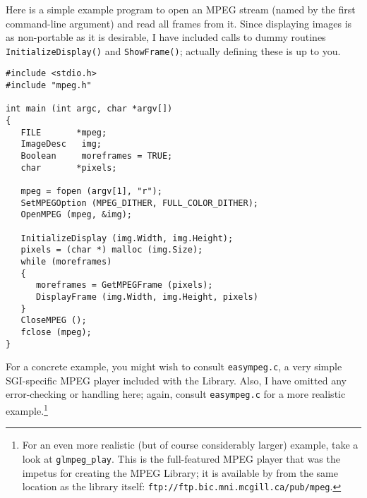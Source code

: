 \documentclass[11pt]{article}
\newcommand{\code}[1]{\texttt{#1}}
\begin{document}
Here is a simple example program to open an MPEG stream (named by the
first command-line argument) and read all frames from it.  Since
displaying images is as non-portable as it is desirable, I have
included calls to dummy routines \code{InitializeDisplay()} and
\code{ShowFrame()}; actually defining these is up to you.  
\begin{verbatim}
#include <stdio.h>
#include "mpeg.h"

int main (int argc, char *argv[])
{
   FILE       *mpeg;
   ImageDesc   img;
   Boolean     moreframes = TRUE;
   char       *pixels;

   mpeg = fopen (argv[1], "r");
   SetMPEGOption (MPEG_DITHER, FULL_COLOR_DITHER);
   OpenMPEG (mpeg, &img);

   InitializeDisplay (img.Width, img.Height);
   pixels = (char *) malloc (img.Size);
   while (moreframes)
   {
      moreframes = GetMPEGFrame (pixels);
      DisplayFrame (img.Width, img.Height, pixels)
   }
   CloseMPEG ();
   fclose (mpeg);
}
\end{verbatim}

For a concrete example, you might wish to consult \code{easympeg.c}, a
very simple SGI-specific MPEG player included with the Library.  Also,
I have omitted any error-checking or handling here; again, consult
\code{easympeg.c} for a more realistic example.\footnote{For an even
more realistic (but of course considerably larger) example, take a
look at \code{glmpeg\_play}.  This is the full-featured MPEG player
that was the impetus for creating the MPEG Library; it is available by
from the same location as the library itself: 
\code{ftp://ftp.bic.mni.mcgill.ca/pub/mpeg}.}
\end{document}
